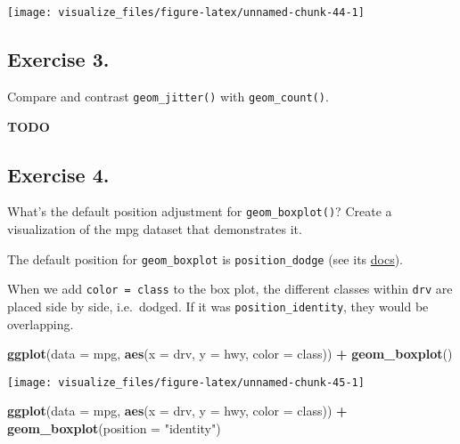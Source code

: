 \documentclass[]{book}
\newenvironment{Shaded}{\begin{snugshade}}{\end{snugshade}}
\newcommand{\DataTypeTok}[1]{\textcolor[rgb]{0.13,0.29,0.53}{#1}}
\newcommand{\KeywordTok}[1]{\textcolor[rgb]{0.13,0.29,0.53}{\textbf{#1}}}
\newcommand{\NormalTok}[1]{#1}
\newcommand{\OperatorTok}[1]{\textcolor[rgb]{0.81,0.36,0.00}{\textbf{#1}}}
\newcommand{\StringTok}[1]{\textcolor[rgb]{0.31,0.60,0.02}{#1}}
\theoremstyle{definition}
\theoremstyle{definition}
\theoremstyle{definition}
\theoremstyle{remark}
\begin{document}
\begin{center}\texttt{[image: visualize\_files/figure-latex/unnamed-chunk-44-1]} \end{center}

\hypertarget{exercise-3.-5}{%
\subsection{Exercise 3.}\label{exercise-3.-5}}

Compare and contrast \texttt{geom\_jitter()} with
\texttt{geom\_count()}.

\textbf{TODO}

\hypertarget{exercise-4.-4}{%
\subsection{Exercise 4.}\label{exercise-4.-4}}

What's the default position adjustment for \texttt{geom\_boxplot()}?
Create a visualization of the mpg dataset that demonstrates it.

The default position for \texttt{geom\_boxplot} is
\texttt{position\_dodge} (see its
\href{http://docs.ggplot2.org/current/geom_boxplot.html}{docs}).

When we add \texttt{color\ =\ class} to the box plot, the different
classes within \texttt{drv} are placed side by side, i.e.~dodged. If it
was \texttt{position\_identity}, they would be overlapping.

\begin{Shaded}
\begin{Highlighting}[]
\KeywordTok{ggplot}\NormalTok{(}\DataTypeTok{data =}\NormalTok{ mpg, }\KeywordTok{aes}\NormalTok{(}\DataTypeTok{x =}\NormalTok{ drv, }\DataTypeTok{y =}\NormalTok{ hwy, }\DataTypeTok{color =}\NormalTok{ class)) }\OperatorTok{+}
\StringTok{  }\KeywordTok{geom_boxplot}\NormalTok{()}
\end{Highlighting}
\end{Shaded}

\begin{center}\texttt{[image: visualize\_files/figure-latex/unnamed-chunk-45-1]} \end{center}

\begin{Shaded}
\begin{Highlighting}[]
\KeywordTok{ggplot}\NormalTok{(}\DataTypeTok{data =}\NormalTok{ mpg, }\KeywordTok{aes}\NormalTok{(}\DataTypeTok{x =}\NormalTok{ drv, }\DataTypeTok{y =}\NormalTok{ hwy, }\DataTypeTok{color =}\NormalTok{ class)) }\OperatorTok{+}
\StringTok{  }\KeywordTok{geom_boxplot}\NormalTok{(}\DataTypeTok{position =} \StringTok{"identity"}\NormalTok{)}
\end{Highlighting}
\end{Shaded}
\end{document}

